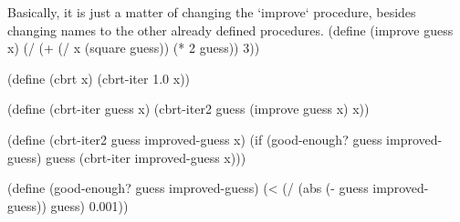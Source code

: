 Basically, it is just a matter of changing the `improve` procedure, besides changing names to the other already defined procedures.
\begtt
(define (improve guess x)
  (/ (+ (/ x (square guess))
        (* 2 guess))
     3))

(define (cbrt x)
  (cbrt-iter 1.0 x))

(define (cbrt-iter guess x)
  (cbrt-iter2 guess (improve guess x) x))

(define (cbrt-iter2 guess improved-guess x)
  (if (good-enough? guess improved-guess)
      guess
      (cbrt-iter improved-guess x)))

(define (good-enough? guess improved-guess)
  (< (/ (abs (- guess improved-guess)) guess) 0.001))
\endtt
